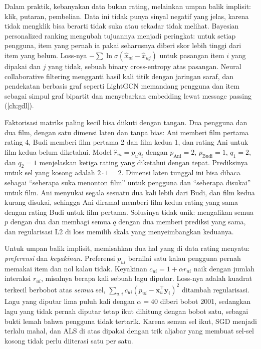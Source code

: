 Dalam praktik, kebanyakan data bukan rating, melainkan umpan balik implisit: klik, putaran, pembelian.
Data ini tidak punya sinyal negatif yang jelas, karena tidak mengklik bisa berarti tidak suka atau
sekadar tidak melihat. Bayesian personalized ranking \citep{rendle2009} mengubah tujuannya menjadi
peringkat: untuk setiap pengguna, item yang pernah ia pakai seharusnya diberi skor lebih tinggi dari item
yang belum. Loss-nya $-\sum\ln\sigma(\hat x_{ui}-\hat x_{uj})$ untuk pasangan item $i$ yang dipakai dan $j$
yang tidak, sebuah binary cross-entropy atas pasangan. Neural collaborative filtering \citep{he2017}
mengganti hasil kali titik dengan jaringan saraf, dan pendekatan berbasis graf seperti LightGCN
\citep{he2020} memandang pengguna dan item sebagai simpul graf bipartit dan menyebarkan embedding lewat
message passing (\cref{ch:gdl}).

Faktorisasi matriks paling kecil bisa diikuti dengan tangan. Dua pengguna dan dua film, dengan satu dimensi laten dan
tanpa bias: Ani memberi film pertama rating 4, Budi memberi film pertama 2 dan film kedua 1, dan rating Ani untuk film kedua
belum diketahui. Model $\hat r_{ui}=p_uq_i$ dengan $p_{\mathrm{Ani}}=2$, $p_{\mathrm{Budi}}=1$, $q_1=2$, dan $q_2=1$ menjelaskan
ketiga rating yang diketahui dengan tepat. Prediksinya untuk sel yang kosong adalah $2\cdot1=2$. Dimensi laten tunggal ini
bisa dibaca sebagai ``seberapa suka menonton film'' untuk pengguna dan ``seberapa disukai'' untuk film. Ani menyukai segala
sesuatu dua kali lebih dari Budi, dan film kedua kurang disukai, sehingga Ani diramal memberi film kedua rating yang sama
dengan rating Budi untuk film pertama. Solusinya tidak unik: mengalikan semua $p$ dengan dua dan membagi semua $q$ dengan dua
memberi prediksi yang sama, dan regularisasi L2 di loss memilih skala yang menyeimbangkan keduanya.

Untuk umpan balik implisit, \citet{hu2008} memisahkan dua hal yang di data rating menyatu: \emph{preferensi} dan
\emph{keyakinan}. Preferensi $p_{ui}$ bernilai satu kalau pengguna pernah memakai item dan nol kalau tidak. Keyakinan
$c_{ui}=1+\alpha r_{ui}$ naik dengan jumlah interaksi $r_{ui}$, misalnya berapa kali sebuah lagu diputar. Loss-nya adalah
kuadrat terkecil berbobot atas \emph{semua} sel, $\sum_{u,i}c_{ui}(p_{ui}-\bm x_u^\top\bm y_i)^2$ ditambah regularisasi. Lagu yang
diputar lima puluh kali dengan $\alpha=40$ diberi bobot 2001, sedangkan lagu yang tidak pernah diputar tetap ikut dihitung
dengan bobot satu, sebagai bukti lemah bahwa pengguna tidak tertarik. Karena semua sel ikut, SGD menjadi terlalu mahal,
dan ALS di atas dipakai dengan trik aljabar yang membuat sel-sel kosong tidak perlu diiterasi satu per satu.

